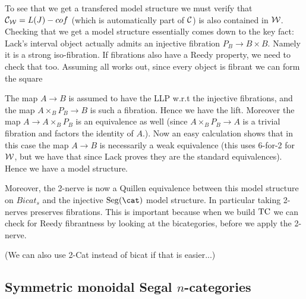 \documentclass[a4paper]{amsart}
\begin{document}
{To see that we get a transfered model structure we must verify that $\mathcal C_\mathcal W = L(J)-cof$ (which is automatically part of $\mathcal C$) is also contained in $\mathcal W$.  Checking that we get a model structure essentially comes down to the  key fact: Lack's interval object actually admits an injective fibration $P_B \to B \times B$. Namely it is a strong iso-fibration. If fibrations also have a Reedy property, we need to check that too. Assuming all works out, since every object is fibrant we can form the square
\begin{center}
\end{center}
The map $A \to B$ is assumed to have the LLP w.r.t the injective fibrations, and the map $A \times_B P_B \to B$ is such a fibration. Hence we have the lift. Moreover the map $A \to A \times_B P_B$ is an equivalence as well (since $A \times_B P_B \to A$ is a trivial fibration and factors the identity of $A$.). 
 Now an easy calculation shows that in this case the map $A \to B$ is necessarily  a weak equivalence (this uses 6-for-2 for $\mathcal W$, but we have that since Lack proves they are the standard equivalences). Hence we have a model structure. 

Moreover, the 2-nerve is now a Quillen equivalence between this model structure on $Bicat_s$ and the injective $\Seg(\cat)$ model structure. In particular taking 2-nerves preserves fibrations. This is important because when we build $\mathrm{TC}$ we can check for Reedy fibrantness by looking at the bicategories, before we apply the 2-nerve. 

(We can also use 2-Cat instead of bicat if that is easier...)

}


\subsection{Symmetric monoidal Segal $n$-categories} \label{sec-symmoninftyNcat}

\end{document}
